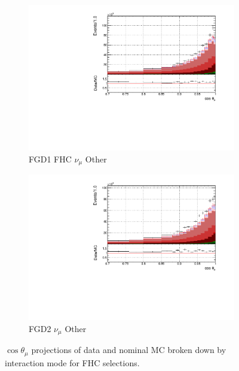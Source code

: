 \begin{figure}[!h]
\begin{subfigure}{0.49\textwidth}
  \centering
  \includegraphics[width=\textwidth]{figs/FGD1_numuCC_other_t}
  \caption{FGD1 FHC $\nu_{\mu}$ Other}
\end{subfigure}
\begin{subfigure}{0.49\textwidth}
  \centering
  \includegraphics[width=\textwidth]{figs/FGD2_numuCC_other_t}
  \caption{FGD2 $\nu_{\mu}$ Other}
\end{subfigure}
\caption{$\cos\theta_{\mu}$ projections of data and nominal MC broken down by interaction mode for FHC selections.}
\label{fig:tstack_fhc}
\end{figure}

